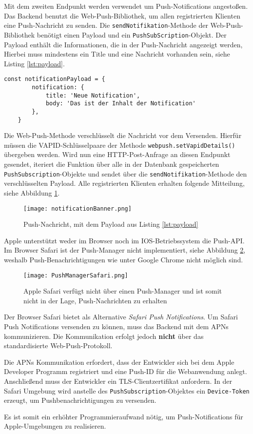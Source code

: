 Mit dem zweiten Endpunkt werden verwendet um Push-Notifications angestoßen. Das Backend benutzt die Web-Push-Bibliothek, um allen registrierten Klienten eine Push-Nachricht zu senden.  Die \texttt{sendNotifikation}-Methode der Web-Push-Bibliothek benötigt einen Payload und ein \texttt{PushSubScription}-Objekt. Der Payload enthält die Informationen, die in der Push-Nachricht angezeigt werden, Hierbei muss mindestens ein Title und eine Nachricht vorhanden sein, siehe Listing \ref{lst:payload}. 

\begin{lstlisting}[caption={Mindestanforderung an einen Payload für eine Push-Nachricht}, label=lst:payload, float=!htb]
    const notificationPayload = {
        notification: {
            title: 'Neue Notification',
            body: 'Das ist der Inhalt der Notification'
        },
    }
\end{lstlisting}

Die Web-Push-Methode verschlüsselt die Nachricht vor dem Versenden. Hierfür müssen die VAPID-Schlüsselpaare der Methode \texttt{webpush.setVapidDetails()} übergeben werden. 
Wird nun eine HTTP-Post-Anfrage an diesen Endpunkt gesendet, iteriert die Funktion über alle in der Datenbank gespeicherten \texttt{PushSubscription}-Objekte und sendet über die \texttt{sendNotifikation}-Methode den verschlüsselten Payload. Alle registrierten Klienten erhalten folgende Mitteilung, siehe Abbildung \ref{img:notificationBanner}.

\begin{figure}[!htb]
    \centering
    \texttt{[image: notificationBanner.png]}
    \caption{Push-Nachricht, mit dem Payload aus Listing \ref{lst:payload}}
    \label{img:notificationBanner}
\end{figure}


Apple unterstützt weder im Browser noch im IOS-Betriebssystem die Push-API. Im Browser Safari ist der Push-Manager nicht implementiert, siehe Abbildung \ref{img:PushManagerBrowser}, weshalb  Push-Benachrichtigungen wie unter Google Chrome nicht möglich sind. 

\begin{figure}[!htb]
    \centering
    \texttt{[image: PushManagerSafari.png]}
    \caption{Apple Safari verfügt nicht über einen Push-Manager und ist somit nicht in der Lage, Push-Nachrichten zu erhalten}
    \label{img:PushManagerBrowser}
\end{figure}


Der Browser Safari bietet als Alternative \textit{Safari Push Notifications}. Um Safari Push Notifications versenden zu können, muss das Backend mit dem \ac*{APNs} kommunizieren. Die Kommunikation erfolgt jedoch \textbf{nicht} über das standardisierte Web-Push-Protokoll.

Die APNs Kommunikation erfordert, dass der Entwickler sich bei dem Apple Developer Programm registriert und eine Push-ID für die Webanwendung anlegt. Anschließend muss der Entwickler ein \ac*{TLS}-Clientzertifikat anfordern. In der Safari Umgebung wird anstelle des \texttt{PushSubscription}-Objektes ein \texttt{Device-Token} erzeugt, um Pushbenachrichtigungen zu versenden. 

Es ist somit ein erhöhter Programmieraufwand nötig, um Push-Notifications für Apple-Umgebungen zu realisieren.
